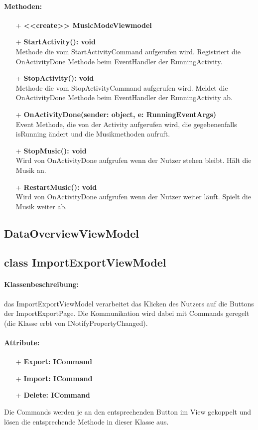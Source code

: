 \documentclass[a4paper,12pt]{article}
\begin{document}
\paragraph{Methoden:}
\begin{itemize}
	\item[+] \textbf{<<create>> MusicModeViewmodel} \\
	\item[+] \textbf{StartActivity(): void} \\ Methode die vom StartActivityCommand aufgerufen wird. Registriert die OnActivityDone Methode beim EventHandler der RunningActivity. 
	\item[+] \textbf{StopActivity(): void} \\ Methode die vom StopActivityCommand aufgerufen wird. Meldet die OnActivityDone Methode beim EventHandler der RunningActivity ab. 
	\item[+] \textbf{OnActivityDone(sender: object, e: RunningEventArgs)} \\ Event Methode, die von der Activity aufgerufen wird, die gegebenenfalls isRunning ändert und die Musikmethoden aufruft.
	\item[+] \textbf{StopMusic(): void} \\ Wird von OnActivityDone aufgrufen wenn der Nutzer stehen bleibt. Hält die Musik an.
	\item[+] \textbf{RestartMusic(): void} \\ Wird von OnActivityDone aufgrufen wenn der Nutzer weiter läuft. Spielt die Musik weiter ab.
\end{itemize}

\subsection{DataOverviewViewModel}

\subsection{class ImportExportViewModel}

\paragraph{Klassenbeschreibung:}
das ImportExportViewModel verarbeitet das Klicken des Nutzers auf die Buttons  der ImportExportPage.
Die Kommunikation wird dabei mit Commands geregelt (die Klasse erbt von INotifyPropertyChanged).
\paragraph{Attribute:}
\begin{itemize}
	\item[+] \textbf{Export: ICommand}
	\item[+] \textbf{Import: ICommand}
	\item[+] \textbf{Delete: ICommand}
\end{itemize}
Die Commands werden je an den entsprechenden Button im View gekoppelt und lösen die entsprechende Methode in dieser Klasse aus.
\end{document}
